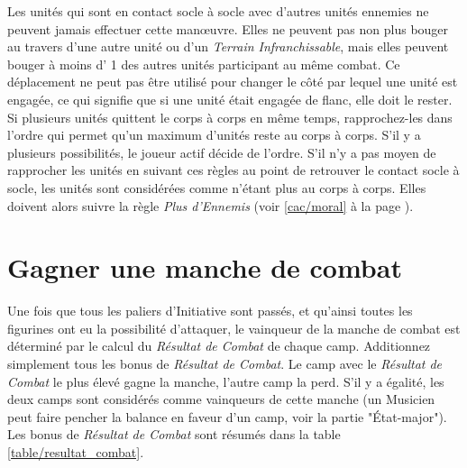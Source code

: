  Les unités qui sont en contact socle à socle avec d'autres unités ennemies ne peuvent jamais effectuer cette manœuvre. Elles ne peuvent pas non plus bouger au travers d'une autre unité ou d'un \emph{Terrain Infranchissable}, mais elles peuvent bouger à moins d' 1{\pouce} des autres unités participant au même combat. Ce déplacement ne peut pas être utilisé pour changer le côté par lequel une unité est engagée, ce qui signifie que si une unité était engagée de flanc, elle doit le rester. Si plusieurs unités quittent le corps à corps en même temps, rapprochez-les dans l'ordre qui permet qu'un maximum d'unités reste au corps à corps. S'il y a plusieurs possibilités, le joueur actif décide de l'ordre. S'il n'y a pas moyen de rapprocher les unités en suivant ces règles au point de retrouver le contact socle à socle, les unités sont considérées comme n'étant plus au corps à corps. Elles doivent alors suivre la règle \emph{Plus d'Ennemis} (voir \ref{cac/moral} à la page \pageref{cac/moral}).

\section{Gagner une manche de combat}

Une fois que tous les paliers d'Initiative sont passés, et qu'ainsi toutes les figurines ont eu la possibilité d'attaquer, le vainqueur de la manche de combat est déterminé par le calcul du \emph{Résultat de Combat} de chaque camp. Additionnez simplement tous les bonus de \emph{Résultat de Combat}. Le camp avec le \emph{Résultat de Combat} le plus élevé gagne la manche, l'autre camp la perd. S'il y a égalité, les deux camps sont considérés comme vainqueurs de cette manche (un Musicien peut faire pencher la balance en faveur d'un camp, voir la partie "État-major"). Les bonus de \emph{Résultat de Combat} sont résumés dans la table \ref{table/resultat_combat}.

